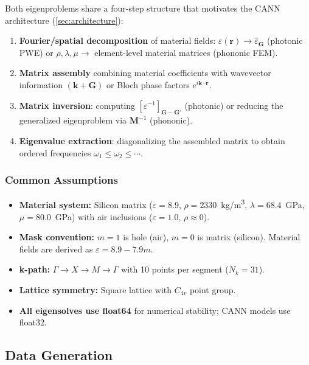 \documentclass[11pt]{article}
\begin{document}
Both eigenproblems share a four-step structure that motivates the CANN architecture (\cref{sec:architecture}):
\begin{enumerate}
    \item \textbf{Fourier/spatial decomposition} of material fields: $\varepsilon(\mathbf{r}) \to \hat{\varepsilon}_\mathbf{G}$ (photonic PWE) or $\rho, \lambda, \mu \to$ element-level material matrices (phononic FEM).
    \item \textbf{Matrix assembly} combining material coefficients with wavevector information $(\mathbf{k} + \mathbf{G})$ or Bloch phase factors $e^{i\mathbf{k}\cdot\mathbf{r}}$.
    \item \textbf{Matrix inversion}: computing $[\varepsilon^{-1}]_{\mathbf{G}-\mathbf{G}'}$ (photonic) or reducing the generalized eigenproblem via $\mathbf{M}^{-1}$ (phononic).
    \item \textbf{Eigenvalue extraction}: diagonalizing the assembled matrix to obtain ordered frequencies $\omega_1 \leq \omega_2 \leq \cdots$.
\end{enumerate}

\subsubsection{Common Assumptions}

\begin{itemize}
    \item \textbf{Material system:} Silicon matrix ($\varepsilon = 8.9$, $\rho = 2330$~\si{kg/m^3}, $\lambda = 68.4$~\si{GPa}, $\mu = 80.0$~\si{GPa}) with air inclusions ($\varepsilon = 1.0$, $\rho \approx 0$).
    \item \textbf{Mask convention:} $m = 1$ is hole (air), $m = 0$ is matrix (silicon). Material fields are derived as $\varepsilon = 8.9 - 7.9m$.
    \item \textbf{k-path:} $\Gamma \to X \to M \to \Gamma$ with 10 points per segment ($N_k = 31$).
    \item \textbf{Lattice symmetry:} Square lattice with $C_{4v}$ point group.
    \item \textbf{All eigensolves use float64} for numerical stability; CANN models use float32.
\end{itemize}

\subsection{Data Generation}
\label{sec:data}
\end{document}
